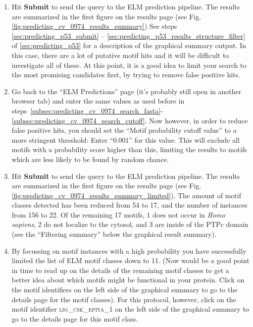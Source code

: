 \documentclass[12pt]{article}
\newcounter{proto}
\newcommand\button[1]{%
	\textbf{#1}%
}
\newcommand\motif[1]{%
    \textsc{\lowercase{#1}}%
}
\begin{document}
\begin{enumerate}
%
%

\item Hit \button{Submit} to send the query to the ELM prediction pipeline.
    The results are summarized in the first figure on the results page
	(see Fig. \ref{fig:predicting_cv_0974_results_summary})
    See steps \ref{sec:predicting_p53_submit} -- \ref{sec:predicting_p53_results_structure_filter}
    of \ref{sec:predicting_p53} for a description of the
    graphical summary output. In this case, there are a lot of putative motif
    hits and it will be difficult to investigate all of these. At this point, it is a good idea
    to limit your search to the most promising candidates first, by trying to remove
    false positive hits.

\item Go back to the ``ELM Predictions'' page (it's probably still open in
    another browser tab) and enter the same values as used before in
	steps~\ref{subsec:predicting_cv_0974_search_fasta}-\ref{subsec:predicting_cv_0974_search_cutoff}.
	Now however, in order to reduce false positive hits,
    you should set the ``Motif probability cutoff value'' to a more
	stringent threshold: Enter ``0.001'' for this value. This will exclude
	all motifs with a probability score higher than this, limiting the
	results to motifs which are less likely to be found by random
	chance.

\item Hit \button{Submit} to send the query to the ELM prediction pipeline.
    The results are summarized in the first figure on the results page
	(see Fig. \ref{fig:predicting_cv_0974_results_summary_limited}).
    The amount of motif classes detected has been
    reduced from 54 to 17, and the number of instances from
    156 to 22. Of the remaining 17 motifs, 1 does not occur in
    \textit{Homo sapiens}, 2 do not localize to the cytosol, and 3 are inside
    of the PTPc domain (see the ``Filtering summary'' below the graphical
    result summary).

\item By focussing on motif instances with a high probability
    you have successfully limited the list of ELM motif classes down to 11.
    (Now would be a good point in time to read up on the details of the
    remaining motif classes to get a better idea about which motifs might be
    functional in your protein. Click on the motif identifiers on the left side
    of the graphical summary to go to the details page for the motif classes).
    For this protocol, however, click on the motif identifier
    \motif{LIG\_CSK\_EPIYA\_1} on the left side of the graphical summary to go
    to the details page for this motif class.


\end{enumerate}
\end{document}
